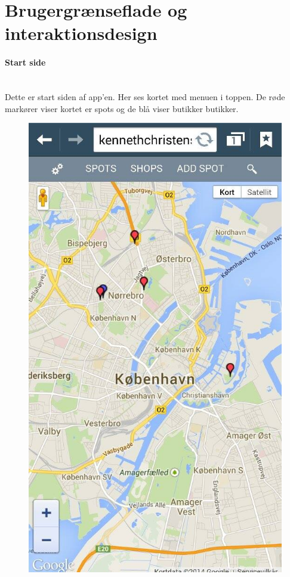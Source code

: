 \documentclass[12pt]{article}
\begin{document}
\section{Brugergrænseflade og interaktionsdesign}

\paragraph{Start side}\mbox{}\\
Dette er start siden af app'en. Her ses kortet med menuen i toppen. De røde markører viser kortet er spots og de blå viser butikker butikker.\\
\begin{figure}[h]
\includegraphics[scale = 0.3]{mobil1}
\end{figure}
\end{document}
